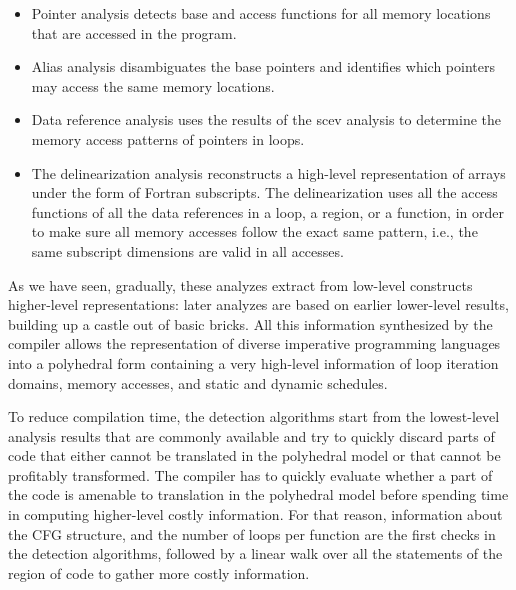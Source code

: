 \documentclass{sig-alternate}
\begin{document}
\begin{itemize}
\item Pointer analysis detects base and access functions for all memory
  locations that are accessed in the program.

\item Alias analysis disambiguates the base pointers and identifies which
  pointers may access the same memory locations.

\item Data reference analysis uses the results of the scev analysis to determine
  the memory access patterns of pointers in loops.

\item The delinearization analysis \cite{delinearization1, delinearization2}
  reconstructs a high-level representation of arrays under the form of Fortran
  subscripts.  The delinearization uses all the access functions of all the data
  references in a loop, a region, or a function, in order to make sure all
  memory accesses follow the exact same pattern, i.e., the same subscript
  dimensions are valid in all accesses.
\end{itemize}

As we have seen, gradually, these analyzes extract from low-level constructs
higher-level representations: later analyzes are based on earlier lower-level
results, building up a castle out of basic bricks.  All this information
synthesized by the compiler allows the representation of diverse imperative
programming languages into a polyhedral form \cite{Girbal} containing a very
high-level information of loop iteration domains, memory accesses, and static
and dynamic schedules.

To reduce compilation time, the \SCoP{} detection algorithms start from the
lowest-level analysis results that are commonly available and try to quickly
discard parts of code that either cannot be translated in the polyhedral model
or that cannot be profitably transformed.  The compiler has to quickly evaluate
whether a part of the code is amenable to translation in the polyhedral model
before spending time in computing higher-level costly information.  For that
reason, information about the CFG structure, and the number of loops per
function are the first checks in the \SCoP{} detection algorithms, followed by a
linear walk over all the statements of the region of code to gather more costly
information.
\end{document}
